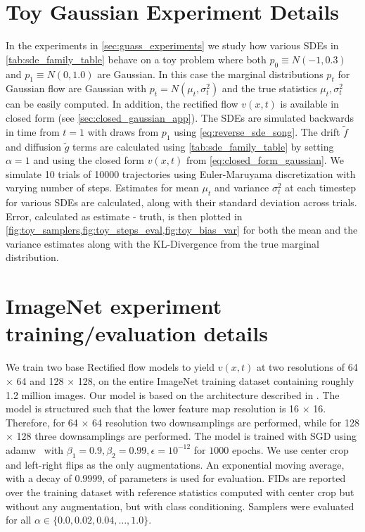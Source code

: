 \section{Toy Gaussian Experiment Details}
\label{sec:toy_details}

In the experiments in \cref{sec:guass_experiments} we study how various SDEs in \cref{tab:sde_family_table} behave on a toy problem where both $p_0 \equiv N(-1, 0.3)$ and $p_1 \equiv N(0, 1.0)$ are Gaussian.
In this case the marginal distributions $p_t$ for Gaussian flow are Gaussian with $p_t = N(\mu_t, \sigma_t^2)$ and the true statistics $\mu_t, \sigma_t^2$ can be easily computed.
In addition, the rectified flow $v(x, t)$ is available in closed form (see \cref{sec:closed_gaussian_app}).
The SDEs are simulated backwards in time from $t=1$ with draws from $p_1$ using \cref{eq:reverse_sde_song}.
The drift $\tilde f$ and diffusion $\tilde g$ terms are calculated using \cref{tab:sde_family_table} by setting $\alpha=1$ and using the closed form $v(x, t)$ from \cref{eq:closed_form_gaussian}.
We simulate 10 trials of 10000 trajectories using Euler-Maruyama discretization with varying number of steps. Estimates for mean $\mu_t$ and variance $\sigma_t^2$ at each timestep for various SDEs are calculated, along with their standard deviation across trials.
Error, calculated as estimate - truth, is then plotted in \cref{fig:toy_samplers,fig:toy_steps_eval,fig:toy_bias_var} for both the mean and the variance estimates along with the KL-Divergence from the true marginal distribution.

\section{ImageNet experiment training/evaluation details}
\label{sec:imagenet_training_details_app}
We train two base Rectified flow models to yield $v(x, t)$ at two resolutions of 64 $\times$ 64 and 128 $\times$ 128, on the entire ImageNet training dataset containing roughly 1.2 million images.
Our model is based on the architecture described in \citet{hoogeboom2023simple}.
The model is structured such that the lower feature map resolution is 16 $\times$ 16.
Therefore, for 64 $\times$ 64 resolution two downsamplings are performed, while for 128 $\times$ 128 three downsamplings are performed.
The model is trained with SGD using adamw~\citep{kingma2014adam,loshchilov2017decoupled} with $\beta_1=0.9, \beta_2=0.99, \epsilon=10^{-12}$ for $1000$ epochs.
We use center crop and left-right flips as the only augmentations.
An exponential moving average, with a decay of $0.9999$, of parameters is used for evaluation.
FIDs are reported over the training dataset with reference statistics computed with center crop but without any augmentation, but with class conditioning.
Samplers were evaluated for all $\alpha \in \{0.0, 0.02, 0.04, \dots, 1.0\}$.

